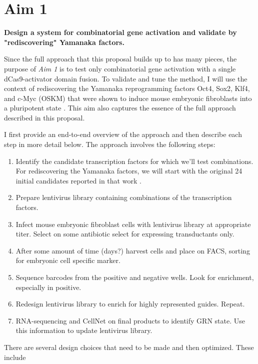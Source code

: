 \documentclass[10pt]{article}
\begin{document}
\section*{Aim 1}

\textbf{Design a system for combinatorial gene activation and validate by "rediscovering" Yamanaka factors.}

Since the full approach that this proposal builds up to has many pieces, the purpose of \textit{Aim 1} is to test only combinatorial gene activation with a single dCas9-activator domain fusion. To validate and tune the method, I will use the context of rediscovering the Yamanaka reprogramming factors Oct4, Sox2, Klf4, and c-Myc (OSKM) that were shown to induce mouse embryonic fibroblasts into a pluripotent state \cite{takahashi2006induction}. This aim also captures the essence of the full approach described in this proposal.

I first provide an end-to-end overview of the approach and then describe each step in more detail below. The approach involves the following steps:

\begin{enumerate}
 \item{Identify the candidate transcription factors for which we'll test combinations. For rediscovering the Yamanaka factors, we will start with the original 24 initial candidates reported in that work \cite{takahashi2006induction}.}
 \item{Prepare lentivirus library containing combinations of the transcription factors.}
 \item{Infect mouse embryonic fibroblast cells with lentivirus library at appropriate titer. Select on some antibiotic select for expressing transductants only.}
 \item{After some amount of time (days?) harvest cells and place on FACS, sorting for embryonic cell specific marker.}
 \item{Sequence barcodes from the positive and negative wells. Look for enrichment, especially in positive.}
 \item{Redesign lentivirus library to enrich for highly represented guides. Repeat.}
 \item{RNA-sequencing and CellNet on final products to identify GRN state. Use this information to update lentivirus library.}
\end{enumerate}

There are several design choices that need to be made and then optimized. These include
\end{document}
